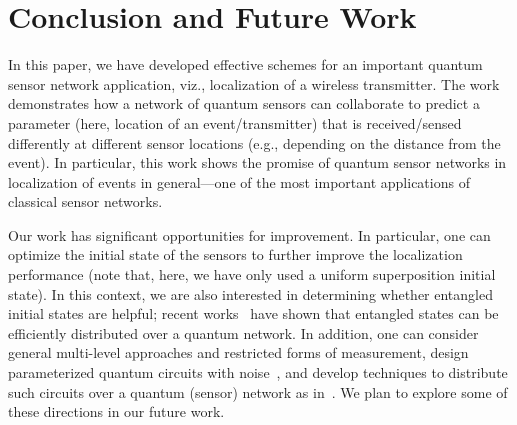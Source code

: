 \section{Conclusion and Future Work}
\label{sec:conclusion}

In this paper, we have developed effective schemes for an important quantum sensor
network application, viz., localization of a wireless transmitter. The work demonstrates
how a network of quantum sensors can collaborate to predict a parameter (here, location of an
event/transmitter) that is received/sensed differently at different sensor locations (e.g., depending on the distance from the event).
In particular, this work shows the promise of quantum sensor networks in localization of 
events in general---one of the most important applications of classical sensor networks.

Our work has significant opportunities for improvement. 
In particular, one can optimize the initial state of the sensors to further improve the localization performance (note that, here, we have only used a uniform superposition initial state).
In this context, we are also interested in determining whether
entangled initial states are helpful; recent 
works~\cite{swapping-tqe-22,predist-qce-22,ghz-qce-23} have shown that entangled states can be efficiently distributed over a quantum network. 
In addition, one can consider general multi-level approaches and restricted forms of measurement,
design parameterized quantum circuits with noise~\cite{quantumnas2022}, 
and develop techniques to distribute such circuits over a quantum (sensor) network as in~\cite{dqc-disc-q21, gdqc-qce-22, dqc-qsw-23}.
We plan to explore some of these directions in our future work.